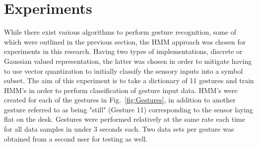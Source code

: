 \documentclass[conference]{IEEEtran}
\newcommand{\FigRef}[1]{Fig.~\ref{fig:#1}}
\begin{document}



\section{Experiments}

While there exist various algorithms to perform gesture recognition, some of which were outlined in the previous section, the HMM approach was chosen for experiments in this research. Having two types of implementations, discrete or Gaussian valued representation, the latter was chosen in order to mitigate having to use vector quantization to initially classify the sensory inputs into a symbol subset. The aim of this experiment is to take a dictionary of 11 gestures and train HMM's in order to perform classification of gesture input data. HMM's were created for each of the gestures in 
\FigRef{Gestures}, in addition to another gesture referred to as being "still" (Gesture 11) corresponding to the sensor laying flat on the desk. Gestures were performed relatively at the same rate each time for all data samples in under 3 seconds each. Two data sets per gesture was obtained from a second user for testing as well.
\end{document}
